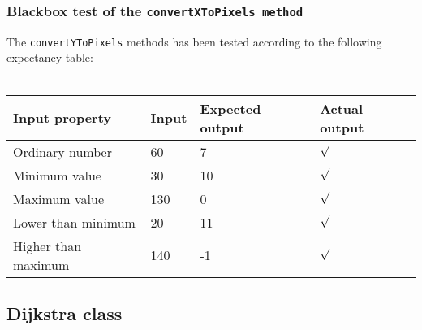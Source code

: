 \documentclass[a4paper,11pt]{article}
\begin{document}
\subsubsection{Blackbox test of the \texttt{convertXToPixels method}}
The \texttt{convertYToPixels} methods has been tested according to the following expectancy table: \\ \\
\begin{tabular}{ p{3.5cm} | p{2.5cm} | p{2.5cm} | p{2.5cm} }
	Input property & Input & Expected output & Actual output \\
	\hline
	Ordinary number & 60 & 7 & $\surd$ \\
	Minimum value & 30 & 10 & $\surd$ \\
	Maximum value & 130 & 0 & $\surd$ \\
	Lower than minimum & 20 & 11 & $\surd$ \\
	Higher than maximum & 140 & -1 & $\surd$
\end{tabular}

\pagebreak
\subsection{Dijkstra class}
\label{sec:Dijkstra class}


\pagebreak
\end{document}
